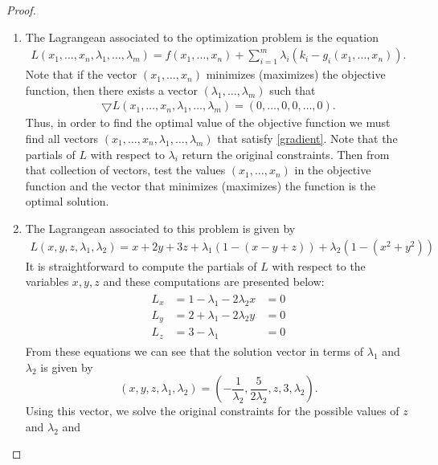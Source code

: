 \documentclass[12pt]{article}
\theoremstyle{definition}
\begin{document}
\begin{proof}
  \begin{enumerate}
    \item The Lagrangean associated to the optimization problem is the equation
      \begin{align*}
        L(x_1, \dots, x_n, \lambda_1, \dots, \lambda_m) = f(x_1, \dots, x_n) + \sum_{i=1}^m \lambda_i (k_i -g_i(x_1, \dots, x_n)).
      \end{align*}
      Note that if the vector $(x_1, \dots, x_n)$ minimizes (maximizes) the objective
      function, then there exists a vector $(\lambda_1, \dots, \lambda_m)$ such that
      \begin{align}\label{gradient}
        \bigtriangledown L(x_1, \dots, x_n, \lambda_1, \dots, \lambda_m) = (0, \dots, 0, 0, \dots, 0).
      \end{align}
      Thus, in order to find the optimal value of the objective function
      we must find all vectors $(x_1, \dots, x_n, \lambda_1, \dots, \lambda_m)$
      that satisfy \eqref{gradient}. Note that the partials of $L$ with respect to $\lambda_i$ return the original
      constraints. Then from that collection of vectors, test the
      values $(x_1, \dots, x_n)$ in the objective function
      and the vector that minimizes (maximizes) the function is the optimal solution.
    \item The Lagrangean associated to this problem is given by
      \begin{align}
        L(x, y, z, \lambda_1, \lambda_2) = x + 2y + 3z + \lambda_1(1 - (x - y + z)) + \lambda_2(1 - (x^2 + y^2))
      \end{align}
      It is straightforward to compute the partials of $L$ with respect to the variables
      $x, y, z$ and these computations are presented below:
      \begin{align*}
        \begin{array}{lll}
          L_x &= 1 - \lambda_1 - 2\lambda_2 x &= 0 \\
          L_y &= 2 + \lambda_1 - 2\lambda_2 y &= 0 \\
          L_z &= 3 - \lambda_1 &= 0
        \end{array}
      \end{align*}
      From these equations we can see that the solution vector in terms of $\lambda_1$ and
      $\lambda_2$ is given by
      $$(x, y, z, \lambda_1, \lambda_2) = \left (-\frac{1}{\lambda_2}, \frac{5}{2\lambda_2}, z, 3, \lambda_2\right).$$
      Using this vector, we solve the original constraints for the possible values of $z$ and $\lambda_2$ and

\end{enumerate}
\end{proof}
\end{document}
